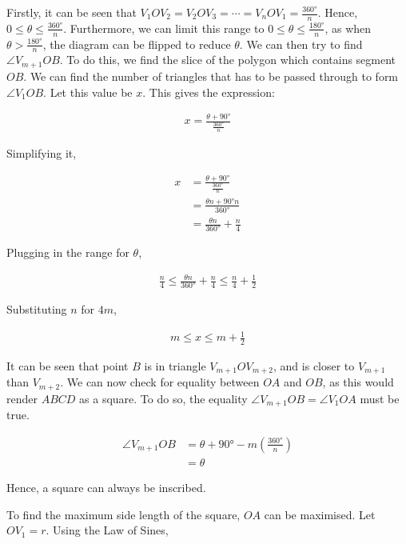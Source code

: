 \documentclass[12pt]{scrartcl}
\begin{document}
Firstly, it can be seen that $V_{1}OV_{2} = V_{2}OV_{3} = \cdots = V_{n}OV_{1} = \frac{\ang{360}}{n}$.
Hence, $0 \leq \theta \leq \frac{\ang{360}}{n}$.
Furthermore, we can limit this range to $0 \leq \theta \leq \frac{\ang{180}}{n}$, as when $\theta > \frac{\ang{180}}{n}$, the diagram can be flipped to reduce $\theta$.
We can then try to find $\angle V_{m+1}OB$. To do this, we find the slice of the polygon which contains segment $OB$. We can find the number of triangles that has to be passed through to form $\angle V_{1}OB$. Let this value be $x$. This gives the expression:

\begin{align*}
	x = \frac{\theta + \ang{90}}{\frac{\ang{360}}{n}}
\end{align*}

Simplifying it,

\begin{align*}
	x & = \frac{\theta + \ang{90}}{\frac{\ang{360}}{n}} \\
	  & = \frac{\theta n + \ang{90} n}{\ang{360}}       \\
	  & = \frac{\theta n}{\ang{360}} + \frac{n}{4}
\end{align*}

Plugging in the range for $\theta$,

\begin{align*}
	\frac{n}{4} \leq \frac{\theta n}{\ang{360}} + \frac{n}{4} \leq \frac{n}{4} + \frac{1}{2}
\end{align*}

Substituting $n$ for $4m$,

\begin{align*}
	m \leq x \leq m + \frac{1}{2}
\end{align*}

It can be seen that point $B$ is in triangle $V_{m+1}OV_{m+2}$, and is closer to $V_{m+1}$ than $V_{m+2}$.
We can now check for equality between $OA$ and $OB$, as this would render $ABCD$ as a square.
To do so, the equality $\angle V_{m+1}OB = \angle V_{1}OA$ must be true.

\begin{align*}
	\angle V_{m+1}OB & = \theta + \ang{90} - m\left(\frac{\ang{360}}{n}\right) \\
	                 & = \theta
\end{align*}

Hence, a square can always be inscribed.

To find the maximum side length of the square, $OA$ can be maximised. Let $OV_{1} = r$.
Using the Law of Sines,
\end{document}

